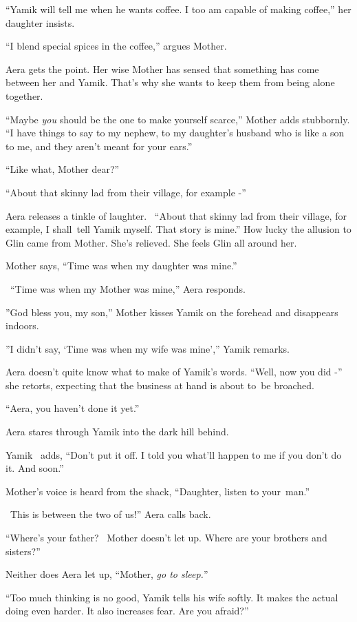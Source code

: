 \documentclass[12pt]{book}
\begin{document}
{}``Yamik will tell me when he wants coffee. I too am capable of making coffee,'' her daughter insists.

{}``I blend special spices in the coffee,'' argues Mother.

Aera gets the point. Her wise Mother has sensed that something has come between her and Yamik. That's why she wants to
keep them from being alone together.

{}``Maybe \textit{you} should be the one to make yourself scarce,'' Mother adds stubbornly. ``I have things to say to my
nephew, to my daughter's husband who is like a son to me, and they aren't meant for your ears.''

{}``Like what, Mother dear?''

{}``About that skinny{ }lad from their village, for example -''

Aera releases a tinkle of laughter. ~``About that skinny lad from their village, for example, I shall~tell Yamik myself.
That story is mine.'' How lucky the allusion to Glin came from Mother. She's relieved. She feels Glin all around her.

Mother says, ``Time was when my daughter was mine.''

\ {}``Time was when my Mother was mine,'' Aera responds.

{}''God bless you, my son,'' Mother kisses Yamik on the forehead and disappears indoors.

{}''I didn't say, `Time was when my wife was mine','' Yamik remarks.

Aera doesn't quite know what to make of Yamik's words. ``Well, now you did{
-}{}'' she retorts, expecting that the business at hand is about to~be broached.

{}``Aera, you haven't done it yet.''~

Aera stares through Yamik into the dark hill behind.

Yamik \ adds, ``Don't put it off. I told you what'll happen to me if you don't do it. And soon.''

Mother's voice is heard from the shack, ``Daughter, listen to your~man.''

~{\textquotedbl}This is between the two of us!'' Aera calls back.

{}``Where's your father?{\textquotedbl} ~Mother doesn't let up. {\textquotedbl}Where{ }are your brothers
and sisters?''

Neither does Aera let up, ``Mother, \textit{go to sleep.}{}''

{}``Too much thinking is no good,{\textquotedbl} Yamik tells his wife softly. {\textquotedbl}It makes the actual doing
even harder. It also increases fear. Are you afraid?''
\end{document}
